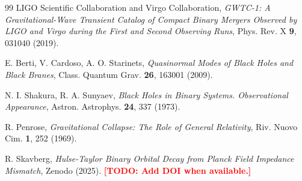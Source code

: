 \documentclass[12pt,a4paper]{article}
\newcommand{\TODO}[1]{\textcolor{red}{\textbf{[TODO: #1]}}}
\theoremstyle{definition}
\begin{document}
\begin{thebibliography}{99}
LIGO Scientific Collaboration and Virgo Collaboration, \textit{GWTC-1: A Gravitational-Wave Transient Catalog of Compact Binary Mergers Observed by LIGO and Virgo during the First and Second Observing Runs}, Phys. Rev. X \textbf{9}, 031040 (2019).

E. Berti, V. Cardoso, A. O. Starinets, \textit{Quasinormal Modes of Black Holes and Black Branes}, Class. Quantum Grav. \textbf{26}, 163001 (2009).

N. I. Shakura, R. A. Sunyaev, \textit{Black Holes in Binary Systems. Observational Appearance}, Astron. Astrophys. \textbf{24}, 337 (1973).

R. Penrose, \textit{Gravitational Collapse: The Role of General Relativity}, Riv. Nuovo Cim. \textbf{1}, 252 (1969).

R. Skavberg, \textit{Hulse-Taylor Binary Orbital Decay from Planck Field Impedance Mismatch}, Zenodo (2025). \TODO{Add DOI when available.}

\end{thebibliography}

\end{document}
